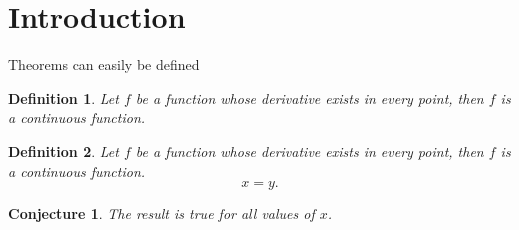 \documentclass{article}
\newtheorem{definition}{Definition}
\newtheorem{conjecture}{Conjecture}
\begin{document}
\section{Introduction}
Theorems can easily be defined

\begin{definition}
	\label{def:label1}
	Let $f$ be a function whose derivative exists in every point, then $f$ is a continuous function.
\end{definition}
 
\begin{definition} %
	\label{def:label2}
	Let $f$ be a function whose derivative exists in every point, then $f$ is a continuous function.
	\begin{equation}
		\label{eq:def2}
		x = y.
	\end{equation}
\end{definition}



\begin{conjecture}
	\label{conjecture:1}
	The result is true for all values of $x$.
\end{conjecture}
\end{document}
